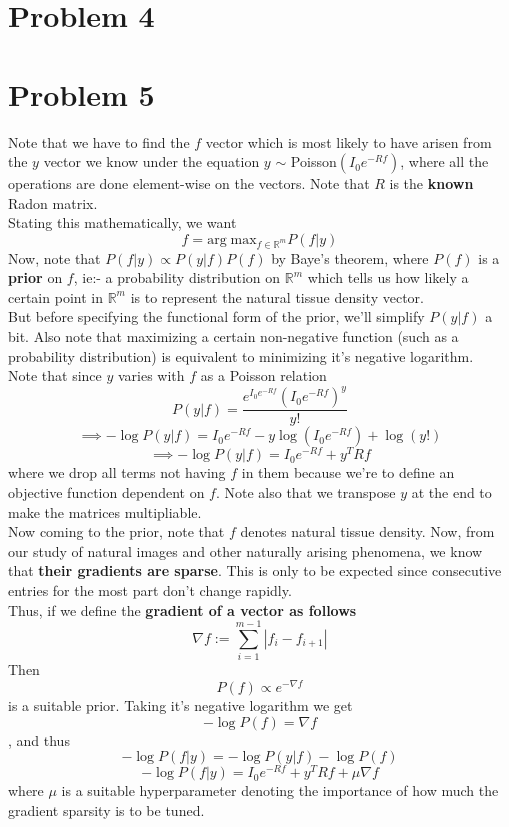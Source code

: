 \documentclass[a4paper,14pt]{article}
\numberwithin{definition}{section}
\numberwithin{mytheorem}{subsection}
\begin{document}
\section{Problem 4}
\section{Problem 5}
Note that we have to find the $f$ vector which is most likely to have arisen from the $y$ vector we know under the equation $y$ $\sim$ Poisson$(I_0e^{-Rf})$, where all the operations are done element-wise on the vectors. Note that $R$ is the \textbf{known} Radon matrix.\\
Stating this mathematically, we want
$$f = \mathrm{arg}\;\mathrm{max}_{f \in \mathbb{R}^m} P(f|y)$$
Now, note that $P(f|y) \propto P(y|f)P(f)$ by Baye's theorem, where $P(f)$ is a \textbf{prior} on $f$, ie:- a probability distribution on $\mathbb{R}^m$ which tells us how likely a certain point in $\mathbb{R}^m$ is to represent the natural tissue density vector.\\
But before specifying the functional form of the prior, we'll simplify $P(y|f)$ a bit. Also note that maximizing a certain non-negative function (such as a probability distribution) is equivalent to minimizing it's negative logarithm.\\
Note that since $y$ varies with $f$ as a Poisson relation
$$P(y|f) = \frac{e^{I_0e^{-Rf}}(I_0e^{-Rf})^y}{y!}$$
$$\implies -\log P(y|f) = I_0e^{-Rf} - y\log (I_0e^{-Rf}) + \log (y!)$$
$$\implies -\log P(y|f) = I_0e^{-Rf} + y^TRf$$
where we drop all terms not having $f$ in them because we're to define an objective function dependent on $f$. Note also that we transpose $y$ at the end to make the matrices multipliable.\\
Now coming to the prior, note that $f$ denotes natural tissue density. Now, from our study of natural images and other naturally arising phenomena, we know that \textbf{their gradients are sparse}. This is only to be expected since consecutive entries for the most part don't change rapidly.\\
Thus, if we define the \textbf{gradient of a vector as follows}
$$\nabla f := \sum^{m - 1}_{i = 1} |f_i - f_{i + 1}|$$
Then
$$P(f) \propto e^{-\nabla f} $$
is a suitable prior. Taking it's negative logarithm we get 
$$-\log P(f) = \nabla f$$, and thus
$$-\log P(f|y) = -\log P(y|f) -\log P(f)$$
$$-\log P(f|y) = I_0e^{-Rf} + y^TRf + \mu\nabla f$$
where $\mu$ is a suitable hyperparameter denoting the importance of how much the gradient sparsity is to be tuned.\\
\end{document}
